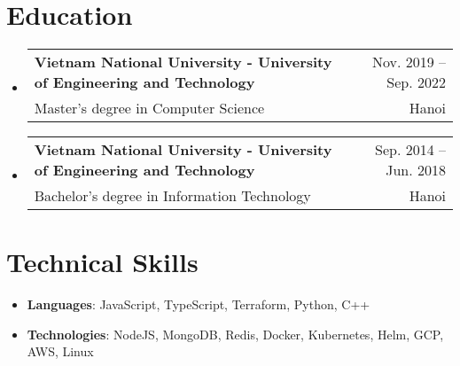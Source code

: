 \documentclass[letterpaper,11pt]{article}
\makeatletter
\newcommand{\resumeSubheading}[4]{
    \vspace{-1pt}\item
        \begin{tabular*}{0.97\textwidth}[t]{l@{\extracolsep{\fill}}r}
            \textbf{#1} & #2 \\
            \small#3 & \small #4 \\
        \end{tabular*}\vspace{-5pt}
}
\newcommand{\resumeSubHeadingListStart}{\begin{itemize}[leftmargin=*]}
\newcommand{\resumeSubHeadingListEnd}{\end{itemize}}
\makeatother
\begin{document}
\section{Education}
    \resumeSubHeadingListStart
        \resumeSubheading
        {Vietnam National University - University of Engineering and Technology}{Nov. 2019 -- Sep. 2022}
        {Master's degree in Computer Science}{Hanoi}
        
        
        \resumeSubheading
        {Vietnam National University - University of Engineering and Technology}{Sep. 2014 -- Jun. 2018}
        {Bachelor's degree in Information Technology}{Hanoi}
    \resumeSubHeadingListEnd


\section{Technical Skills}
    \resumeSubHeadingListStart
        \item{\textbf{Languages}{: JavaScript, TypeScript, Terraform, Python, C++}}
        \item{\textbf{Technologies}{: NodeJS, MongoDB, Redis, Docker, Kubernetes, Helm, GCP, AWS, Linux}}
    \resumeSubHeadingListEnd



\end{document}
